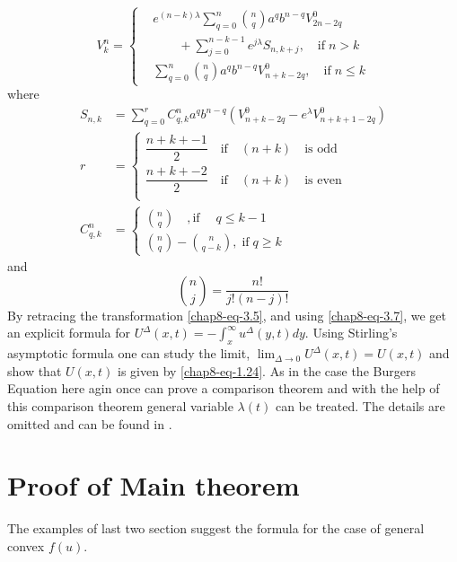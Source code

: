 \begin{equation}\label{chap8-eq-3.7}
V_{k}^{n}=\left\{
\begin{aligned}
&e^{(n-k)\lambda}\sum\limits_{q=0}^{n}\binom{n}{q}a^{q}b^{n-q}V_{2n-2q}^{0}\\
&\qquad + \sum\limits_{j=0}^{n-k-1} e^{j\lambda}S_{n,k+j},\quad \text{if} \; n > k\\
&\sum\limits_{q=0}^{n}\binom{n}{q}a^{q}b^{n-q}V_{n+k-2q}^{0},\quad \text{if} \; n\leq k
\end{aligned}
\right.
\end{equation}
where\pageoriginale
\begin{align*}
S_{n,k} &=\sum\limits_{q=0}^{r}C_{q,k}^{n}a^{q}b^{n-q}\left(V_{n+k-2q}^{0}-e^{\lambda}V_{n+k+1-2q}^{0}\right)\\
r &= 
\begin{cases}
 \dfrac{n+k+-1}{2}\quad \text{if}\quad (n+k)\quad \text{is odd}\\
 \dfrac{n+k+-2}{2}\quad \text{if}\quad (n+k)\quad \text{is even}\\
\end{cases}\\
C_{q,k}^{n}&=
\begin{cases}
\binom{n}{q} \quad , \text{if}\; \quad q \leq k-1\\
\binom{n}{q}-\binom{n}{q-k},\; \text{if}\; q \geq k
\end{cases}
\end{align*}
and
$$
\binom{n}{j} = \dfrac{n!}{j!(n-j)!}
$$
By retracing the transformation \eqref{chap8-eq-3.5}, and using \eqref{chap8-eq-3.7}, we get an explicit formula for $U^{\Delta}(x,t)= -\int_{x}^{\infty}u^{\Delta}(y,t)dy$. Using Stirling's asymptotic formula one can study the limit, $\lim_{\Delta \rightarrow 0}U^{\Delta}(x,t) =U(x, t)$ and show that $U(x,t)$ is given by \eqref{chap8-eq-1.24}. As in the case the Burgers Equation here agin once can prove a comparison theorem and with the help of this comparison theorem general variable $\lambda(t)$ can be treated. The details are omitted and can be found in \cite{chap8-key4}.

\section{Proof of Main theorem}\label{chap8-sec-4}
The examples of last two section suggest the formula for the case of general convex $f(u)$.

